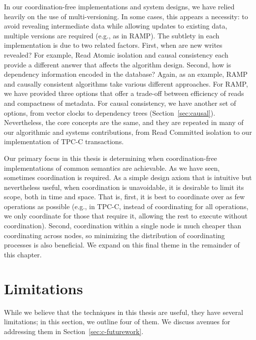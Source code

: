  In our
coordination-free implementations and system designs, we have relied
heavily on the use of multi-versioning. In some cases, this appears a
necessity: to avoid revealing intermediate data while allowing updates
to existing data, multiple versions are required (e.g., as in
RAMP). The subtlety in each implementation is due to two related
factors. First, when are new writes revealed? For example, Read Atomic
isolation and causal consistency each provide a different answer that
affects the algorithm design. Second, how is dependency information
encoded in the database? Again, as an example, RAMP and causally
consistent algorithms take various different approaches. For RAMP, we
have provided three options that offer a trade-off between efficiency
of reads and compactness of metadata. For causal consistency, we have
another set of options, from vector clocks to dependency trees
(Section~\ref{sec:causal}). Nevertheless, the core concepts are the
same, and they are repeated in many of our algorithmic and systems
contributions, from Read Committed isolation to our \iconfluent
implementation of TPC-C transactions.

 Our primary
focus in this thesis is determining when coordination-free
implementations of common semantics are achievable. As we have seen,
sometimes coordination is required. As a simple design axiom that is
intuitive but nevertheless useful, when coordination is unavoidable,
it is desirable to limit its scope, both in time and space. That is,
first, it is best to coordinate over as few operations as possible
(e.g., in TPC-C, instead of coordinating for all operations, we only
coordinate for those that require it, allowing the rest to execute
without coordination). Second, coordination within a single node is
much cheaper than coordinating across nodes, so minimizing the
distribution of coordinating processes is also beneficial. We expand
on this final theme in the remainder of this chapter.

\section{Limitations}
\label{sec:c-limitations}

While we believe that the techniques in this thesis are useful, they
have several limitations; in this section, we outline four of them. We
discuss avenues for addressing them in Section~\ref{sec:c-futurework}.

